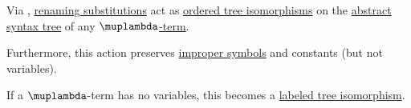 \begin{lemma}\label{thm:lambda_renaming_substitution_isomorphism}
  Via , \hyperref[def:lambda_renaming_substitution]{renaming substitutions} act as \hyperref[def:ordered_tree]{ordered tree isomorphisms} on the \hyperref[def:lambda_term_ast]{abstract syntax tree} of any \hyperref[def:lambda_term]{\( \muplambda \)-term}.

  Furthermore, this action preserves \hyperref[def:lambda_term_alphabet]{improper symbols} and constants (but not variables).
\end{lemma}
\begin{comments}
  \item If a \( \muplambda \)-term has no variables, this becomes a \hyperref[def:labeled_tree/morphism]{labeled tree isomorphism}.
\end{comments}
